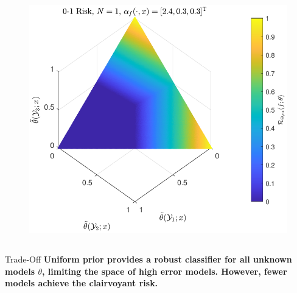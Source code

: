 \documentclass[aspectratio=169]{beamer}
\begin{document}
\begin{frame}
\begin{columns}[c]
\begin{column}{.5\linewidth}
\begin{figure}
\centering
\includegraphics[width=0.8\linewidth]{Risk_cond_ex_01_Dir_theta__subj.pdf}
\label{fig:Risk_cond_ex_01_Dir_theta__subj}
\end{figure}

\end{column}

\end{columns}

\vspace{-0.5em}
\begin{block}{Trade-Off}
\textbf{Uniform prior provides a robust classifier for all unknown models $\theta$, limiting the space of high error models. However, fewer models achieve the clairvoyant risk.}
\end{block}


\end{frame}
\end{document}
